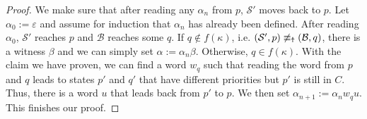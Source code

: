 \begin{proof}
	We make sure that after reading any $\alpha_n$ from $p$, $\mathcal{S}'$ moves back to $p$. Let $\alpha_0 := \varepsilon$ and assume for induction that $\alpha_n$ has already been defined. After reading $\alpha_0$, $\mathcal{S}'$ reaches $p$ and $\mathcal{B}$ reaches some $q$. If $q \notin f(\kappa)$, i.e. $(\mathcal{S}', p) \not\equiv_\text{\Ankh} (\mathcal{B}, q)$, there is a witness $\beta$ and we can simply set $\alpha := \alpha_n \beta$. Otherwise, $q \in f(\kappa)$. With the claim we have proven, we can find a word $w_q$ such that reading the word from $p$ and $q$ leads to states $p'$ and $q'$ that have different priorities but $p'$ is still in $C$. Thus, there is a word $u$ that leads back from $p'$ to $p$. We then set $\alpha_{n+1} := \alpha_n w_q u$. This finishes our proof.
\end{proof}





